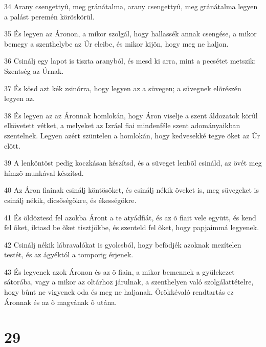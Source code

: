\par 34 Arany csengettyû, meg gránátalma, arany csengettyû, meg gránátalma legyen a palást peremén köröskörül.
\par 35 És legyen az Áronon, a mikor szolgál, hogy hallassék annak csengése, a mikor bemegy a szenthelybe az Úr eleibe, és mikor kijön, hogy meg ne haljon.
\par 36 Csinálj egy lapot is tiszta aranyból, és mesd ki arra, mint a pecsétet metszik: Szentség az Úrnak.
\par 37 És kösd azt kék zsinórra, hogy legyen az a süvegen; a süvegnek elõrészén legyen az.
\par 38 És legyen az az Áronnak homlokán, hogy Áron viselje a szent áldozatok körûl elkövetett vétket, a melyeket az Izráel fiai mindenféle szent adományaikban szentelnek. Legyen azért szüntelen a homlokán, hogy kedvesekké tegye õket az Úr elõtt.
\par 39 A lenköntöst pedig koczkásan készítsd, és a süveget lenbõl csináld, az övét meg hímzõ munkával készítsd.
\par 40 Az Áron fiainak csinálj köntösöket, és csinálj nékik öveket is, meg süvegeket is csinálj nékik, dicsõségökre, és ékességökre.
\par 41 És öldöztesd fel azokba Áront a te atyádfiát, és az õ fiait vele együtt, és kend fel õket, iktasd be õket tisztjökbe, és szenteld fel õket, hogy papjaimmá legyenek.
\par 42 Csinálj nékik lábravalókat is gyolcsból, hogy befödjék azoknak mezítelen testét, és az ágyéktól a tomporig érjenek.
\par 43 És legyenek azok Áronon és az õ fiain, a mikor bemennek a gyülekezet sátorába, vagy a mikor az oltárhoz járulnak, a szenthelyen való szolgálattételre, hogy bûnt ne vigyenek oda és meg ne haljanak. Örökkévaló rendtartás ez Áronnak és az õ magvának õ utána.

\chapter{29}

